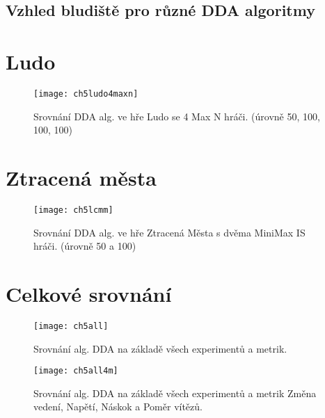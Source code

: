 \subsection{Vzhled bludiště pro různé DDA algoritmy}

\section{Ludo}

\begin{figure}
  \centering
  \texttt{[image: ch5ludo4maxn]}
	\caption{Srovnání DDA alg. ve hře Ludo se 4 Max N hráči. (úrovně 50, 100, 100, 100)}
	\label{fig-ch5ludo4maxn}
\end{figure}

\section{Ztracená města}

\begin{figure}
  \centering
  \texttt{[image: ch5lcmm]}
	\caption{Srovnání DDA alg. ve hře Ztracená Města s dvěma MiniMax IS hráči. (úrovně 50 a 100)}
	\label{fig-ch5lcmm}
\end{figure}

\section{Celkové srovnání}
\begin{figure}
  \centering
  \texttt{[image: ch5all]}
	\caption{ Srovnání alg. DDA na základě všech experimentů a metrik. }
	\label{fig-ch5all}
\end{figure}

\begin{figure}
  \centering
  \texttt{[image: ch5all4m]}
	\caption{ Srovnání alg. DDA na základě všech experimentů a metrik Změna vedení, Napětí, Náskok a Poměr vítězů. }
	\label{fig-ch5all4m}
\end{figure}

\endinput
